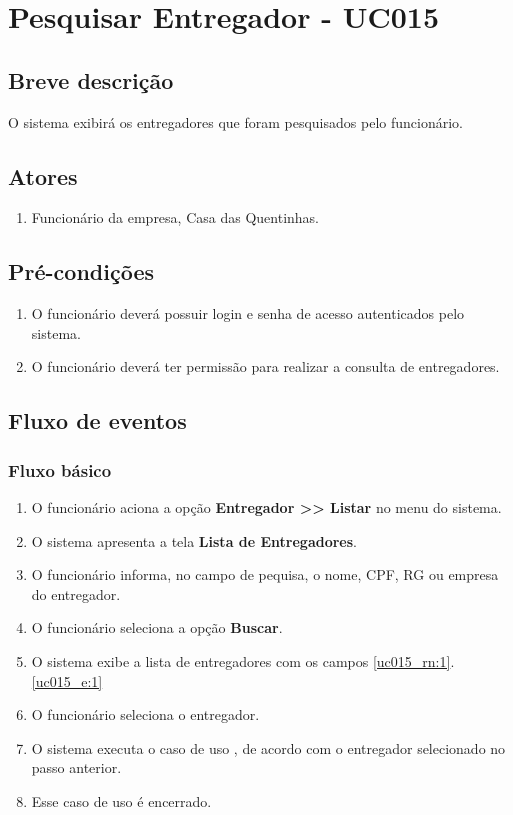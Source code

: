 \chapter{Pesquisar Entregador - UC015} \label{uc015}

\section{Breve descrição}

O sistema exibirá os entregadores que foram pesquisados pelo funcionário.

\section{Atores}

\begin{enumerate}
	\item Funcionário da empresa, Casa das Quentinhas.
\end{enumerate}

\section{Pré-condições}

\begin{enumerate}
	\item O funcionário deverá possuir login e senha de acesso autenticados pelo sistema.
	\item O funcionário deverá ter permissão para realizar a consulta de entregadores.
\end{enumerate}

\section{Fluxo de eventos}

\subsection{Fluxo básico}

\begin{enumerate}[label=P\arabic*]
	\item O funcionário aciona a opção \textbf{Entregador >> Listar} no menu do sistema.
	\item O sistema apresenta a tela \textbf{Lista de Entregadores}.	
	\item O funcionário informa, no campo de pequisa, o nome, CPF, RG ou empresa do entregador. \label{uc015_p:3}
	\item O funcionário seleciona a opção \textbf{Buscar}.
	\item O sistema exibe a lista de entregadores com os campos \ref{uc015_rn:1}. \ref{uc015_e:1}
	\item O funcionário seleciona o entregador.
	\item O sistema executa o caso de uso , de acordo com o entregador selecionado no passo anterior.
	\item Esse caso de uso é encerrado.
\end{enumerate}

